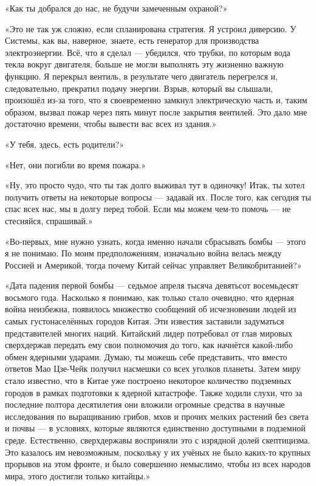 \documentclass[a4paper,12pt]{book}
\begin{document}
\par
«Как ты добрался до нас, не будучи замеченным охраной?»
\par
«Это не так уж сложно, если спланирована стратегия. Я устроил диверсию. У Системы, как вы, наверное, знаете, есть генератор для производства электроэнергии. Всё, что я сделал — убедился, что трубки, по которым вода текла вокруг двигателя, больше не могли выполнять эту жизненно важную функцию. Я перекрыл вентиль, в результате чего двигатель перегрелся и, следовательно, прекратил подачу энергии. Взрыв, который вы слышали, произошёл из-за того, что я своевременно замкнул электрическую часть и, таким образом, вызвал пожар через пять минут после закрытия вентилей. Это дало мне достаточно времени, чтобы вывести вас всех из здания.»
\par
«У тебя, здесь, есть родители?»
\par
«Нет, они погибли во время пожара.»
\par
«Ну, это просто чудо, что ты так долго выживал тут в одиночку! Итак, ты хотел получить ответы на некоторые вопросы — задавай их. После того, как сегодня ты спас всех нас, мы в долгу перед тобой. Если мы можем чем-то помочь — не стесняйся, спрашивай.»
\par
«Во-первых, мне нужно узнать, когда именно начали сбрасывать бомбы — этого я не понимаю. По моим предположениям, изначально война велась между Россией и Америкой, тогда почему Китай сейчас управляет Великобританией?»
\par
«Дата падения первой бомбы — седьмое апреля тысяча девятьсот восемьдесят восьмого года. Насколько я понимаю, как только стало очевидно, что ядерная война неизбежна, появилось множество сообщений об исчезновении людей из самых густонаселённых городов Китая. Эти известия заставили задуматься представителей многих наций. Китайский лидер потребовал от глав мировых сверхдержав передать ему свои полномочия до того, как начнётся какой-либо обмен ядерными ударами. Думаю, ты можешь себе представить, что вместо ответов Мао Цзе-Чейк получил насмешки со всех уголков планеты. Затем миру стало известно, что в Китае уже построено некоторое количество подземных городов в рамках подготовки к ядерной катастрофе. Также ходили слухи, что за последние полтора десятилетия они вложили огромные средства в научные исследования по выращиванию грибов, мхов и прочих мелких растений без света и почвы — в условиях, которые являются единственно доступными в подземной среде. Естественно, сверхдержавы восприняли это с изрядной долей скептицизма. Это казалось им невозможным, поскольку у их учёных не было каких-то крупных прорывов на этом фронте, и было совершенно немыслимо, чтобы из всех народов мира, этого достигли только китайцы.»
\end{document}
